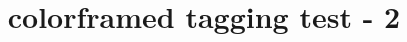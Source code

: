 \documentclass{article}
\title{colorframed tagging test - 2}
\begin{document}
\begin{framed}
\kant[1-6]
\end{framed}
\end{document}
